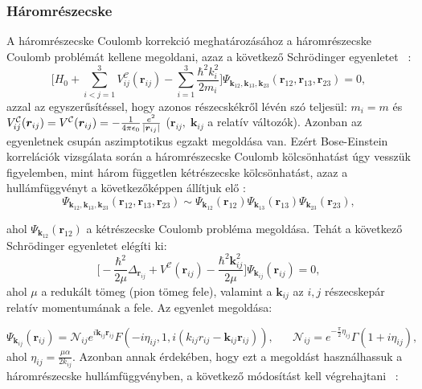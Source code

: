 \documentclass[10pt,a4paper]{article}
\numberwithin{equation}{subsection}
\numberwithin{figure}{section}
\begin{document}
\subsubsection{Háromrészecske}

A háromrészecske Coulomb korrekció meghatározásához a háromrészecske Coulomb problémát kellene megoldani, azaz a következő Schrödinger egyenletet ~\cite{Alt:1998nr}:
\begin{equation}
\Bigg[H_0+\sum_{i<j=1}^3V^{\mathcal{C}}_{ij}(\bm{r}_{ij})
-\sum_{i=1}^3\frac{\hbar^2 k^2_i}{2m_i}
\Bigg]\Psi_{\bm{k}_{12}, \bm{k}_{13}, \bm{k}_{23}}(\bm{r}_{12},\bm{r}_{13},\bm{r}_{23}) = 0,
\end{equation}
azzal az egyszerűsítéssel, hogy azonos részecskékről lévén szó teljesül: $m_i=m$ és $V^\mathcal{C}_{ij}(\bm{r}_{ij})=V^\mathcal{C}(\bm{r}_{ij})=-\frac{1}{4\pi\epsilon_0}\frac{e^2}{\abs{\bm{r}_{ij}}}$ ($\bm{r}_{ij},\;\bm{k}_{ij}$ a relatív változók). Azonban az egyenletnek csupán aszimptotikus egzakt megoldása van. Ezért Bose-Einstein korrelációk vizsgálata során a háromrészecske Coulomb kölcsönhatást úgy vesszük figyelemben, mint három független kétrészecske kölcsönhatást, azaz a hullámfüggvényt a következőképpen állítjuk elő : ~\cite{Alt:1998nr}
\begin{equation}
\Psi_{\bm{k}_{12}, \bm{k}_{13}, \bm{k}_{23}}(\bm{r}_{12},\bm{r}_{13},\bm{r}_{23})  \sim
\Psi_{\bm{k}_{12}}(\bm{r}_{12})\Psi_{\bm{k}_{13}}(\bm{r}_{13})\Psi_{\bm{k}_{23}}(\bm{r}_{23}),
\end{equation}

ahol $\Psi_{\bm{k}_{12}}(\bm{r}_{12})$ a kétrészecske Coulomb probléma megoldása. Tehát a következő Schrödinger egyenletet elégíti ki:
\begin{equation}
\Bigg[-\frac{\hbar^2}{2\mu}\Delta_{\bm{r}_{ij}}+V^\mathcal{C}(\bm{r}_{ij})-\frac{\hbar^2 \bm{k}^2_{ij}}{2\mu}
\Bigg]\Psi_{\bm{k}_{ij}}(\bm{r}_{ij})=0,
\end{equation}
ahol $\mu$ a redukált tömeg (pion tömeg fele), valamint a $\bm{k}_{ij}$ az $i,j$ részecskepár relatív momentumának a fele. Az egyenlet megoldása:

\begin{equation}
\Psi_{\bm{k}_{ij}}(\bm{r}_{ij}) = \mathcal{N}_{ij}e^{i\bm{k}_{ij}\bm{r}_{ij}}F(-i\eta_{ij},1,i(k_{ij}r_{ij}-\bm{k}_{ij}\bm{r}_{ij})),\;\;\;\;\;\;
\mathcal{N}_{ij}=e^{-\frac{\pi}{2}\eta_{ij}}\Gamma(1+i\eta_{ij}),
\end{equation}
ahol $\eta_{ij}=\frac{\mu\alpha}{2k_{ij}}$. Azonban annak érdekében, hogy ezt a megoldást használhassuk a háromrészecske hullámfüggvényben, a következő módosítást kell végrehajtani  ~\cite{Alt:1998nr,Biyajima:2003ey, Mizoguchi:2000km}:
\end{document}
